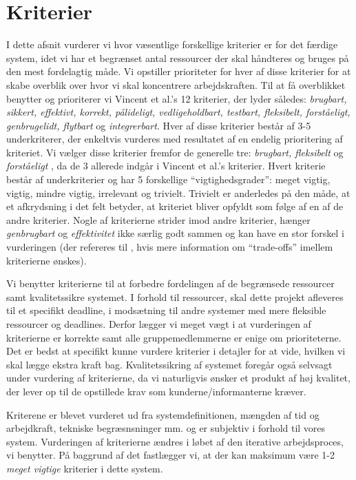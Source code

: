 \section{Kriterier}
I dette afsnit vurderer vi hvor væsentlige forskellige kriterier er for det færdige system, idet vi har et begrænset antal ressourcer der skal håndteres og bruges på den mest fordelagtig måde. Vi opstiller prioriteter for hver af disse kriterier for at skabe overblik over hvor vi skal koncentrere arbejdskraften. Til at få overblikket benytter og prioriterer vi Vincent et al.'s 12 kriterier, der lyder således: \emph{brugbart, sikkert, effektivt, korrekt, pålideligt, vedligeholdbart, testbart, fleksibelt, forståeligt, genbrugelidt, flytbart} og \emph{integrerbart}. Hver af disse kriterier består af 3-5 underkriterer, der enkeltvis vurderes med resultatet af en endelig prioritering af kriteriet. Vi vælger disse kriterier fremfor de generelle tre: \emph{brugbart, fleksibelt} og \emph{forståeligt} \cite{crit}, da de 3 allerede indgår i Vincent et al.'s kriterier. Hvert kriterie består af underkriterier og har 5 forskellige ``vigtighedsgrader'': meget vigtig, vigtig, mindre vigtig, irrelevant og trivielt. Trivielt er anderledes på den måde, at et afkrydsning i det felt betyder, at kriteriet bliver opfyldt som følge af en af de andre kriterier. Nogle af kriterierne strider imod andre kriterier, \fx hænger \emph{genbrugbart} og \emph{effektivitet} ikke særlig godt sammen og kan have en stor forskel i vurderingen (der refereres til \cite[s.~18]{crit}, hvis mere information om ``trade-offs'' imellem kriterierne ønskes).

Vi benytter kriterierne til at forbedre fordelingen af de begrænsede ressourcer samt kvalitetssikre systemet. I forhold til ressourcer, skal dette projekt afleveres til et specifikt deadline, i modsætning til andre systemer med mere fleksible ressourcer og deadlines. Derfor lægger vi meget vægt i at vurderingen af kriterierne er korrekte samt alle gruppemedlemmerne er enige om prioriteterne. Det er bedst at specifikt kunne vurdere kriterier i detajler for at vide, hvilken vi skal lægge ekstra kraft bag. Kvalitetssikring af systemet foregår også selvsagt under vurdering af kriterierne, da vi naturligvis ønsker et produkt af høj kvalitet, der lever op til de opstillede krav som kunderne/informanterne kræver.

Kriterene er blevet vurderet ud fra systemdefinitionen, mængden af tid og arbejdkraft, tekniske begræsnsninger mm. og er subjektiv i forhold til vores system. Vurderingen af kriterierne ændres i løbet af den iterative arbejdsproces, vi benytter. På baggrund af det fastlægger vi, at der kan maksimum være 1-2 \emph{meget vigtige} kriterier i dette system.

